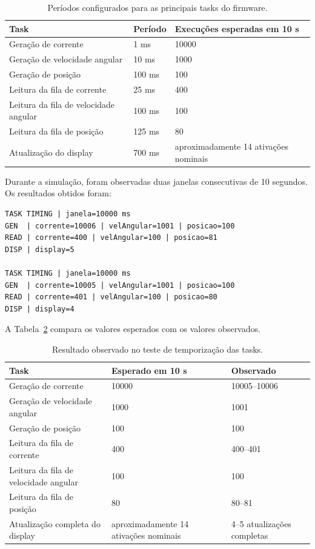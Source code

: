 \documentclass[a4paper,10pt]{article}
\begin{document}
\begin{table}[h]
\centering
\renewcommand{\arraystretch}{1.3}
\begin{tabular}{|p{5.2cm}|p{3.2cm}|p{4.2cm}|}
\hline
\textbf{Task} & \textbf{Período} & \textbf{Execuções esperadas em 10 s} \\
\hline
Geração de corrente & 1 ms & 10000 \\
\hline
Geração de velocidade angular & 10 ms & 1000 \\
\hline
Geração de posição & 100 ms & 100 \\
\hline
Leitura da fila de corrente & 25 ms & 400 \\
\hline
Leitura da fila de velocidade angular & 100 ms & 100 \\
\hline
Leitura da fila de posição & 125 ms & 80 \\
\hline
Atualização do display & 700 ms & aproximadamente 14 ativações nominais \\
\hline
\end{tabular}
\caption{Períodos configurados para as principais tasks do firmware.}
\label{tab:periodos_tasks}
\end{table}

Durante a simulação, foram observadas duas janelas consecutivas de 10 segundos. Os resultados obtidos foram:

\begin{verbatim}
TASK TIMING | janela=10000 ms
GEN  | corrente=10006 | velAngular=1001 | posicao=100
READ | corrente=400 | velAngular=100 | posicao=81
DISP | display=5

TASK TIMING | janela=10000 ms
GEN  | corrente=10005 | velAngular=1001 | posicao=100
READ | corrente=401 | velAngular=100 | posicao=80
DISP | display=4
\end{verbatim}

A Tabela~\ref{tab:resultado_temporizacao} compara os valores esperados com os valores observados.

\begin{table}[h]
\centering
\renewcommand{\arraystretch}{1.3}
\begin{tabular}{|p{5.2cm}|p{3.2cm}|p{4.2cm}|}
\hline
\textbf{Task} & \textbf{Esperado em 10 s} & \textbf{Observado} \\
\hline
Geração de corrente & 10000 & 10005--10006 \\
\hline
Geração de velocidade angular & 1000 & 1001 \\
\hline
Geração de posição & 100 & 100 \\
\hline
Leitura da fila de corrente & 400 & 400--401 \\
\hline
Leitura da fila de velocidade angular & 100 & 100 \\
\hline
Leitura da fila de posição & 80 & 80--81 \\
\hline
Atualização completa do display & aproximadamente 14 ativações nominais & 4--5 atualizações completas \\
\hline
\end{tabular}
\caption{Resultado observado no teste de temporização das tasks.}
\label{tab:resultado_temporizacao}
\end{table}
\end{document}
